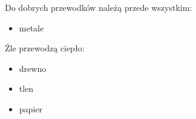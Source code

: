 Do dobrych przewodków należą przede wszystkim:
\begin {itemize}
\item metale
\end {itemize}
Źle przewodzą ciepło:
\begin {itemize}
\item drewno
\item tlen
\item papier
\end {itemize}
